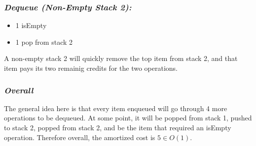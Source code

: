 \subsubsection*{\em Dequeue (Non-Empty Stack 2):}
\begin{itemize}
\item 1 isEmpty 
\item 1 pop from stack 2
\end{itemize}

A non-empty stack 2 will quickly remove the top item from stack 2, and that item pays its two remainig credits for the two operations.

\subsubsection*{\em Overall}
The general idea here is that every item enqueued will go through 4 more operations to be dequeued. At some point, it will be popped from stack 1, pushed to stack 2, popped from stack 2, and be the item that required an isEmpty operation. Therefore overall, the amortized cost is $5 \in O(1)$.
